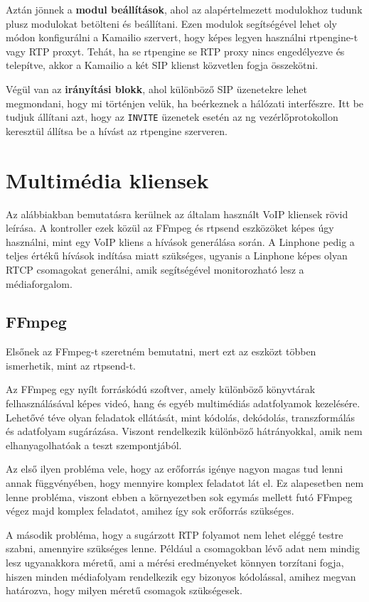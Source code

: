 Aztán jönnek a \textbf{modul beállítások}, ahol az alapértelmezett modulokhoz tudunk plusz
modulokat betölteni és beállítani. Ezen modulok segítségével lehet oly módon konfigurálni 
a Kamailio szervert, hogy képes legyen használni rtpengine-t vagy RTP proxyt. Tehát, ha 
se rtpengine se RTP proxy nincs engedélyezve és telepítve, akkor a Kamailio a két SIP 
klienst közvetlen fogja összekötni.

Végül van az \textbf{irányítási blokk}, ahol különböző SIP üzenetekre lehet megmondani, 
hogy mi történjen velük, ha beérkeznek a hálózati interfészre. Itt be tudjuk állítani 
azt, hogy az \texttt{INVITE} üzenetek esetén az ng vezérlőprotokollon keresztül állítsa 
be a hívást az rtpengine szerveren.

\section{Multimédia kliensek}

Az alábbiakban bemutatásra kerülnek az általam használt VoIP kliensek rövid leírása. A kontroller ezek közül az FFmpeg és rtpsend eszközöket képes úgy használni, mint egy VoIP kliens a hívások generálása során. A Linphone pedig a teljes értékű hívások indítása miatt szükséges, ugyanis a Linphone képes olyan RTCP csomagokat generálni, amik segítségével monitorozható lesz a médiaforgalom. 

\subsection{FFmpeg}

Elsőnek az FFmpeg-t szeretném bemutatni, mert ezt az eszközt többen ismerhetik,
mint az rtpsend-t. 

Az FFmpeg \cite{ffmpeg} egy nyílt forráskódú szoftver, amely különböző könyvtárak 
felhasználásával képes videó, hang és egyéb multimédiás adatfolyamok kezelésére. Lehetővé 
téve olyan feladatok ellátását, mint kódolás, dekódolás, transzformálás és adatfolyam 
sugárázása. Viszont rendelkezik különböző hátrányokkal, amik nem elhanyagolhatóak a teszt 
szempontjából.

Az első ilyen probléma vele, hogy az erőforrás igénye nagyon magas tud lenni 
annak függvényében, hogy mennyire komplex feladatot lát el. Ez alapesetben nem lenne
probléma, viszont ebben a környezetben sok egymás mellett futó FFmpeg végez majd
komplex feladatot, amihez így sok erőforrás szükséges.

A második probléma, hogy a sugárzott RTP folyamot nem lehet eléggé testre szabni, 
amennyire szükséges lenne. Például a csomagokban lévő adat nem mindig lesz 
ugyanakkora méretű, ami a mérési eredményeket könnyen torzítani fogja, hiszen 
minden médiafolyam rendelkezik egy bizonyos kódolással, amihez megvan határozva, hogy
milyen méretű csomagok szükségesek.

